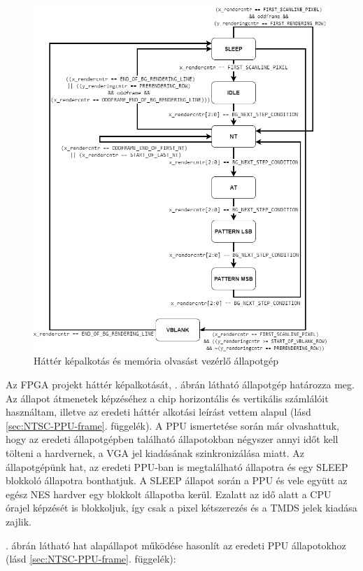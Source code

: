 	\begin{figure}[H]
		\centering
		\includegraphics[width=150mm, keepaspectratio]{figures/bg-rendering-FSM}
		\caption{Háttér képalkotás és memória olvasást vezérlő állapotgép} 
		\label{fig:bg-rendering-FSM}
	\end{figure} 
	
	Az FPGA projekt háttér képalkotását, . ábrán látható állapotgép határozza meg. Az állapot átmenetek képzéséhez a chip horizontális és vertikális számlálóit használtam, illetve az eredeti háttér alkotási leírást vettem alapul (lásd \ref{sec:NTSC-PPU-frame}. függelék). A PPU ismertetése során már olvashattuk, hogy az eredeti állapotgépben található állapotokban négyszer annyi időt kell tölteni a hardvernek, a VGA jel kiadásának szinkronizálása miatt. Az állapotgépünk hat, az eredeti PPU-ban is megtalálható állapotra és egy SLEEP blokkoló állapotra bonthatjuk. A SLEEP állapot során a PPU és vele együtt az egész NES hardver egy blokkolt állapotba kerül. Ezalatt az idő alatt a CPU órajel képzését is blokkoljuk, így csak a pixel kétszerezés és a TMDS jelek kiadása zajlik. 
	
	. ábrán látható hat alapállapot működése hasonlít az eredeti PPU állapotokhoz (lásd \ref{sec:NTSC-PPU-frame}. függelék):
	
